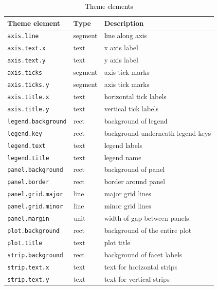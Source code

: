 \begin{table}
  \begin{center}
  \begin{tabular}{lll}\\
    \toprule
    Theme element              & Type     & Description  \\
    \midrule                              
    \texttt{axis.line}         & segment  & line along axis  \\
    \texttt{axis.text.x}       & text     & x axis label  \\
    \texttt{axis.text.y}       & text     & y axis label  \\
    \texttt{axis.ticks}        & segment  & axis tick marks  \\
    \texttt{axis.ticks.y}      & segment  & axis tick marks  \\
    \texttt{axis.title.x}      & text     & horizontal tick labels  \\
    \texttt{axis.title.y}      & text     & vertical tick labels  \\[0.5em]

    \texttt{legend.background} & rect     & background of legend  \\
    \texttt{legend.key}        & rect     & background underneath legend keys \\
    \texttt{legend.text}       & text     & legend labels  \\
    \texttt{legend.title}      & text     & legend name  \\[0.5em]

    \texttt{panel.background}  & rect     & background of panel  \\
    \texttt{panel.border}      & rect     & border around panel  \\
    \texttt{panel.grid.major}  & line     & major grid lines \\
    \texttt{panel.grid.minor}  & line     & minor grid lines \\
    \texttt{panel.margin}      & unit     & width of gap between panels \\[0.5em]
    \texttt{plot.background}   & rect     & background of the entire plot \\
    \texttt{plot.title}        & text     & plot title   \\[0.5em]

    \texttt{strip.background}  & rect     & background of facet labels   \\
    \texttt{strip.text.x}      & text     & text for horizontal strips  \\
    \texttt{strip.text.y}      & text     & text for vertical strips  \\
    \bottomrule                           
  
  \end{tabular}
  \end{center}
  \caption{Theme elements}
  \label{tbl:elements}
\end{table}

